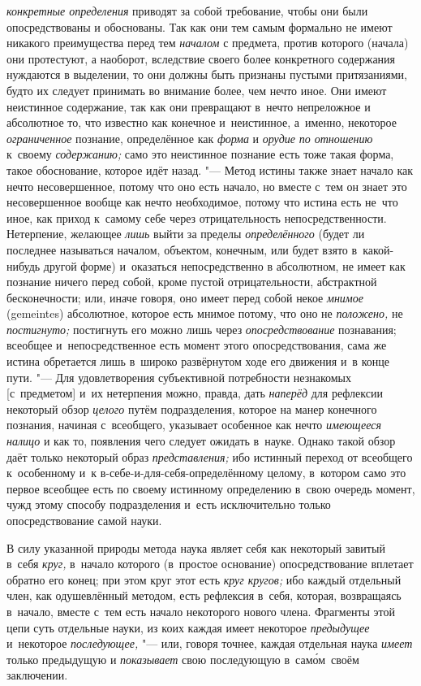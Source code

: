 {\em конкретные определения}
приводят за собой требование, чтобы они были опосредствованы
и обоснованы. Так как они тем самым формально не имеют никакого
преимущества перед тем {\em началом}
с предмета, против которого (начала) они протестуют, а
наоборот, вследствие своего более конкретного содержания нуждаются в
выделении, то они должны быть признаны пустыми притязаниями, будто их
следует принимать во внимание более, чем нечто иное. Они имеют
неистинное содержание, так как они превращают в~нечто непреложное и
абсолютное то, что известно как конечное и~неистинное, а~именно, некоторое
{\em ограниченное} познание, определённое как {\em форма} и {\em орудие}
{\em по отношению} к~своему {\em содержанию;}
само это неистинное познание есть тоже такая форма, такое
обоснование, которое идёт назад. "--- Метод истины также знает
начало как нечто несовершенное, потому что оно есть начало, но вместе с~тем
он знает это несовершенное вообще как нечто необходимое,
потому что истина есть не~что иное, как приход к~самому себе через
отрицательность непосредственности. Нетерпение, желающее
{\em лишь} выйти за пределы {\em определённого}
(будет ли последнее называться началом, объектом, конечным,
или будет взято в~какой-нибудь другой форме) и~оказаться непосредственно в
абсолютном, не имеет как познание ничего перед собой, кроме пустой
отрицательности, абстрактной бесконечности; или, иначе говоря, оно имеет
перед собой некое {\em мнимое} (gemeintes) абсолютное, которое есть мнимое
потому, что оно не {\em положено,} не {\em постигнуто;}
постигнуть его можно лишь через {\em опосредствование}
познавания; всеобщее и~непосредственное есть момент этого
опосредствования, сама же истина обретается лишь в~широко развёрнутом ходе
его движения и~в конце пути. "--- Для удовлетворения
субъективной потребности незнакомых [с~предметом] и~их нетерпения можно,
правда, дать {\em наперёд} для рефлексии некоторый обзор {\em целого} путём
подразделения, которое на манер конечного познания, начиная с~всеобщего,
указывает особенное как нечто {\em имеющееся налицо} и
как то, появления чего следует ожидать в~науке. Однако такой обзор даёт
только некоторый образ {\em представления;} ибо
истинный переход от всеобщего к~особенному и~к
в-себе-и-для-себя-определённому целому, в~котором само это первое всеобщее
есть по своему истинному определению в~свою очередь момент, чужд этому
способу подразделения и~есть исключительно только опосредствование самой науки.

В силу указанной природы метода наука являет себя как некоторый завитый в~себя
{\em круг,} в~начало которого (в~простое основание) опосредствование вплетает
обратно его конец; при этом круг этот есть {\em круг кругов;} ибо каждый
отдельный член, как одушевлённый методом, есть рефлексия в~себя, которая,
возвращаясь в~начало, вместе с~тем есть начало некоторого нового члена.
Фрагменты этой цепи суть отдельные науки, из коих каждая имеет некоторое
{\em предыдущее} и~некоторое {\em последующее,} "--- или, говоря точнее,
каждая отдельная наука {\em имеет} только предыдущую и {\em показывает}
свою последующую в~сам\'{о}м~своём заключении.

